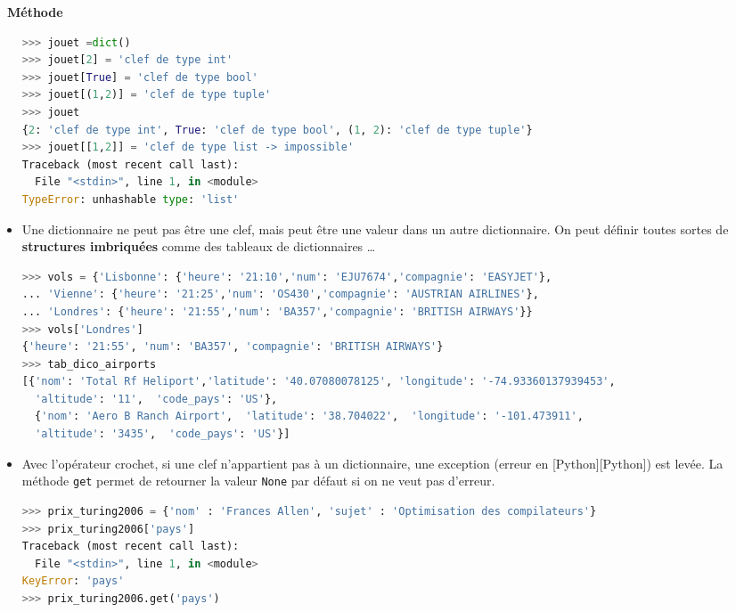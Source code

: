 \documentclass[
  11pt,
]{article}
\newcommand{\passthrough}[1]{#1}
\newenvironment{methode}[1]
{\par \medskip    \noindent  
 \begin {bclogo}[arrondi =0.1,logo=\bcoutil, marge=4,noborder = true] {~\textbf{Méthode}   {\itshape #1} }  \par}
{
\end{bclogo}
 \par \bigskip }
\begin{document}
\begin{methode}{}
\begin{itemize}
\begin{lstlisting}[language=Python]
>>> jouet =dict()
>>> jouet[2] = 'clef de type int'
>>> jouet[True] = 'clef de type bool'
>>> jouet[(1,2)] = 'clef de type tuple'
>>> jouet
{2: 'clef de type int', True: 'clef de type bool', (1, 2): 'clef de type tuple'}
>>> jouet[[1,2]] = 'clef de type list -> impossible'
Traceback (most recent call last):
  File "<stdin>", line 1, in <module>
TypeError: unhashable type: 'list'
\end{lstlisting}
\item
  Une dictionnaire ne peut pas être une clef, mais peut être une valeur
  dans un autre dictionnaire. On peut définir toutes sortes de
  \textbf{structures imbriquées} comme des tableaux de dictionnaires
  \ldots{}

\begin{lstlisting}[language=Python]
>>> vols = {'Lisbonne': {'heure': '21:10','num': 'EJU7674','compagnie': 'EASYJET'},
... 'Vienne': {'heure': '21:25','num': 'OS430','compagnie': 'AUSTRIAN AIRLINES'},
... 'Londres': {'heure': '21:55','num': 'BA357','compagnie': 'BRITISH AIRWAYS'}}
>>> vols['Londres']
{'heure': '21:55', 'num': 'BA357', 'compagnie': 'BRITISH AIRWAYS'}
>>> tab_dico_airports
[{'nom': 'Total Rf Heliport','latitude': '40.07080078125', 'longitude': '-74.93360137939453',
  'altitude': '11',  'code_pays': 'US'},
  {'nom': 'Aero B Ranch Airport',  'latitude': '38.704022',  'longitude': '-101.473911',
  'altitude': '3435',  'code_pays': 'US'}]
\end{lstlisting}
\item
  Avec l'opérateur crochet, si une clef n'appartient pas à un
  dictionnaire, une exception (erreur en {[}Python{]}{[}Python{]}) est
  levée. La méthode \passthrough{\lstinline!get!} permet de retourner la
  valeur \passthrough{\lstinline!None!} par défaut si on ne veut pas
  d'erreur.

\begin{lstlisting}[language=Python]
>>> prix_turing2006 = {'nom' : 'Frances Allen', 'sujet' : 'Optimisation des compilateurs'}
>>> prix_turing2006['pays']
Traceback (most recent call last):
  File "<stdin>", line 1, in <module>
KeyError: 'pays'
>>> prix_turing2006.get('pays')
\end{lstlisting}
\end{itemize}

\end{methode}
\end{document}
